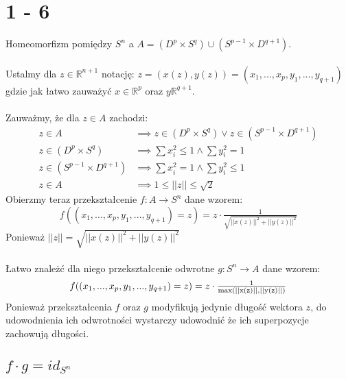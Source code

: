 \section*{1 - 6}
Homeomorfizm pomiędzy $ S^n $ a $A = (D^p \times S^q) \cup (S^{p-1} \times D^{q+1})$. \\
\\
Ustalmy dla $ z \in \mathbb{R}^{n+1}$ notację: $  z = (x(z), y(z)) = (x_1, ..., x_p, y_1, ..., y_{q+1}) $ gdzie jak łatwo zauważyć $x \in \mathbb{R}^p$ oraz $y \mathbb{R}^{q+1} $. \\
\\
Zauważmy, że dla $z \in A$ zachodzi:
\begin{align*}
  z \in A & \implies z \in (D^p \times S^q) \lor z \in (S^{p-1} \times D^{q+1}) \\
  z \in (D^p \times S^q) & \implies \sum x_i^2 \leq 1 \land \sum y_i^2 = 1 \\
  z \in (S^{p-1} \times D^{q+1}) & \implies \sum x_i^2 = 1 \land \sum y_i^2 \leq 1 \\
  z \in A & \implies 1 \leq ||z|| \leq \sqrt{2}
\end{align*}
Obierzmy teraz przekształcenie $ f : A \to S^n $ dane wzorem:
\begin{equation*}
  f((x_1, ..., x_p, y_1, ..., y_{q+1}) = z) = z \cdot \tfrac{1}{\sqrt{||x(z)||^2 + ||y(z)||^2}}
\end{equation*}
Ponieważ $ ||z|| = \sqrt{||x(z)||^2 + ||y(z)||^2} $\\
\\
Łatwo znależć dla niego przekształcenie odwrotne $ g : S^n \to A $ dane wzorem:
\begin{equation*}
  f((x_1, ..., x_p, y_1, ..., y_{q+1}) = z) = z \cdot \tfrac{1}{\rm max(||x(z)||, ||y(z)||)}
\end{equation*}
Ponieważ przekształcenia $f$ oraz $g$ modyfikują jedynie długość wektora $z$, do udowodnienia ich odwrotności wystarczy udowodnić że ich superpozycje zachowują długości.

\subsection{$f \cdot g = id_{S^n}$}
